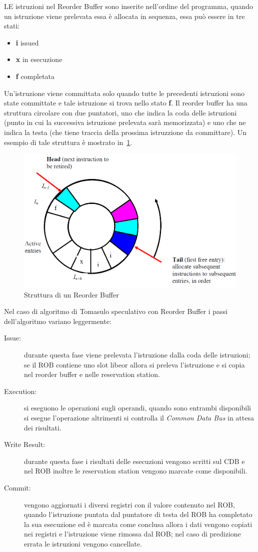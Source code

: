 LE istruzioni nel Reorder Buffer sono inserite nell'ordine del programma, quando un istruzione viene prelevata essa è allocata in sequenza, essa può essere in tre stati:
\begin{itemize}
\item \textbf{i} issued
\item \textbf{x} in esecuzione
\item \textbf{f} completata
\end{itemize}
Un'istruzione viene committata solo quando tutte le precedenti istruzioni sono state committate e tale istruzione si trova nello stato \textbf{f}.
Il reorder buffer ha una struttura circolare con due puntatori, uno che indica la coda delle istruzioni (punto in cui la successiva istruzione prelevata sarà memorizzata) e uno che ne indica la testa (che tiene traccia della prossima istruzzione da committare). Un esempio di tale struttura è mostrato in \figurename\,\ref{fig:reorderbuff}.
\begin{figure}[htb]
\centering
\includegraphics[scale=0.5]{img/reorderbuff.png}
\caption{Struttura di un Reorder Buffer}\label{fig:reorderbuff}
\end{figure}
Nel caso di algoritmo di Tomasulo speculativo con Reorder Buffer i passi dell'algoritmo variano leggermente:
\begin{description}
\item[Issue:] durante questa fase viene prelevata l'istruzione dalla coda delle istruzioni; se il ROB contiene uno slot libeor allora si preleva l'istruzione e si copia nel reorder buffer e nelle reservation station.
\item[Execution:] si eseguono le operazioni sugli operandi, quando sono entrambi disponibili si esegue l'operazione altrimenti si controlla il \emph{Common Data Bus} in attesa dei risultati.
\item[Write Result:] durante questa fase i risultati delle esecuzioni vengono scritti sul CDB e nel ROB inoltre le reservation station vengono marcate come disponibili.
\item[Commit:] vengono aggiornati i diversi registri con il valore contenuto nel ROB, quando l'istruzione puntata dal puntatore di testa del ROB ha completato la sua esecuzione ed è marcata come conclusa allora i dati vengono  copiati nei registri e l'istruzione viene rimossa dal ROB; nel caso di predizione errata le istruzioni vengono cancellate.
\end{description}
